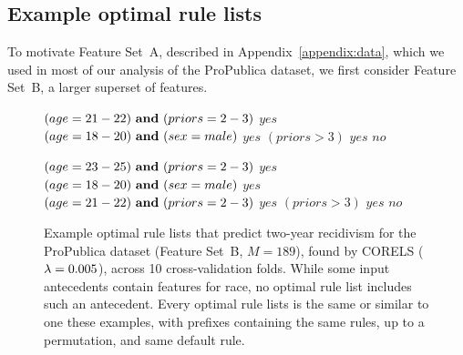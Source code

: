\subsection{Example optimal rule lists}
\label{sec:examples}

To motivate Feature Set~A, described in Appendix~\ref{appendix:data},
which we used in most of our analysis of the ProPublica dataset,
we first consider Feature Set~B, a larger superset of features.

%
\begin{figure}[t!]
\begin{algorithmic}
\State \bif $(age = 21-22) {\bf ~and~} (priors = 2-3)$ \bthen $yes$
\State \belif $(age = 18-20){\bf ~and~} (sex = male)$ \bthen $yes$
\State \belif $(priors > 3)$ \bthen $yes$
\State \belse $no$
\end{algorithmic}
\vspace{1mm}
\begin{algorithmic}
\State \bif $(age = 23-25) {\bf ~and~} (priors = 2-3)$ \bthen $yes$
\State \belif $(age = 18-20){\bf ~and~} (sex = male)$ \bthen $yes$
\State \belif $(age = 21-22) {\bf ~and~} (priors = 2-3)$ \bthen $yes$
\State \belif $(priors > 3)$ \bthen $yes$
\State \belse $no$
\end{algorithmic}
\caption{Example optimal rule lists that predict two-year recidivism for the
ProPublica dataset (Feature Set~B, ${M=189}$), found by CORELS (${{\lambda} = 0.005}$), across 10 cross-validation folds.
%
While some input antecedents contain features for race, no optimal rule list includes such an antecedent.
%
%
Every optimal rule lists is the same or similar to one these examples,
with prefixes containing the same rules, up to a permutation, and same default rule.
}
\label{fig:propublica}
\end{figure}
%
